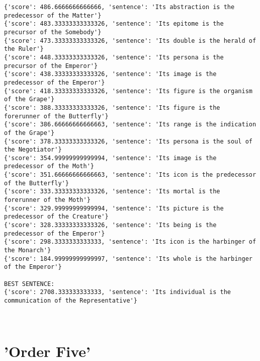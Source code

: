 \documentclass[12pt,a4paper,oneside]{book}
\begin{document}
\begin{verbatim}
{'score': 486.6666666666666, 'sentence': 'Its abstraction is the predecessor of the Matter'}
{'score': 483.33333333333326, 'sentence': 'Its epitome is the precursor of the Somebody'}
{'score': 473.33333333333326, 'sentence': 'Its double is the herald of the Ruler'}
{'score': 448.33333333333326, 'sentence': 'Its persona is the precursor of the Emperor'}
{'score': 438.33333333333326, 'sentence': 'Its image is the predecessor of the Emperor'}
{'score': 418.33333333333326, 'sentence': 'Its figure is the organism of the Grape'}
{'score': 388.33333333333326, 'sentence': 'Its figure is the forerunner of the Butterfly'}
{'score': 386.66666666666663, 'sentence': 'Its range is the indication of the Grape'}
{'score': 378.33333333333326, 'sentence': 'Its persona is the soul of the Negotiator'}
{'score': 354.99999999999994, 'sentence': 'Its image is the predecessor of the Moth'}
{'score': 351.66666666666663, 'sentence': 'Its icon is the predecessor of the Butterfly'}
{'score': 333.33333333333326, 'sentence': 'Its mortal is the forerunner of the Moth'}
{'score': 329.99999999999994, 'sentence': 'Its picture is the predecessor of the Creature'}
{'score': 328.33333333333326, 'sentence': 'Its being is the predecessor of the Emperor'}
{'score': 298.3333333333333, 'sentence': 'Its icon is the harbinger of the Monarch'}
{'score': 184.99999999999997, 'sentence': 'Its whole is the harbinger of the Emperor'}

BEST SENTENCE:
{'score': 2708.333333333333, 'sentence': 'Its individual is the communication of the Representative'}



\end{verbatim}

\chapter*{'Order Five'}
\end{document}
